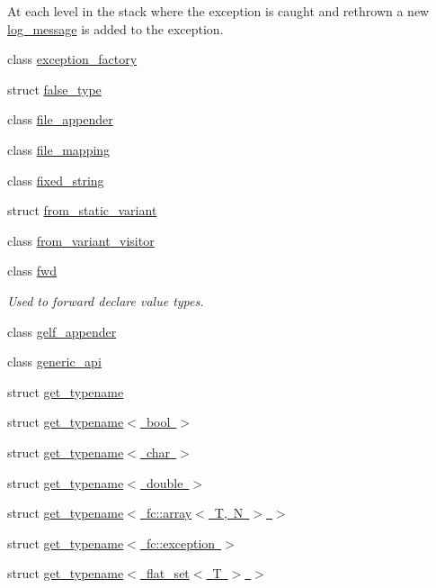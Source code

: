\begin{DoxyCompactItemize}
\begin{DoxyCompactList}
At each level in the stack where the exception is caught and rethrown a new \mbox{\hyperlink{classfc_1_1log__message}{log\+\_\+message}} is added to the exception. \end{DoxyCompactList}\item 
class \mbox{\hyperlink{classfc_1_1exception__factory}{exception\+\_\+factory}}
\item 
struct \mbox{\hyperlink{structfc_1_1false__type}{false\+\_\+type}}
\item 
class \mbox{\hyperlink{classfc_1_1file__appender}{file\+\_\+appender}}
\item 
class \mbox{\hyperlink{classfc_1_1file__mapping}{file\+\_\+mapping}}
\item 
class \mbox{\hyperlink{classfc_1_1fixed__string}{fixed\+\_\+string}}
\item 
struct \mbox{\hyperlink{structfc_1_1from__static__variant}{from\+\_\+static\+\_\+variant}}
\item 
class \mbox{\hyperlink{classfc_1_1from__variant__visitor}{from\+\_\+variant\+\_\+visitor}}
\item 
class \mbox{\hyperlink{classfc_1_1fwd}{fwd}}
\begin{DoxyCompactList}\small\item\em Used to forward declare value types. \end{DoxyCompactList}\item 
class \mbox{\hyperlink{classfc_1_1gelf__appender}{gelf\+\_\+appender}}
\item 
class \mbox{\hyperlink{classfc_1_1generic__api}{generic\+\_\+api}}
\item 
struct \mbox{\hyperlink{structfc_1_1get__typename}{get\+\_\+typename}}
\item 
struct \mbox{\hyperlink{structfc_1_1get__typename_3_01bool_01_4}{get\+\_\+typename$<$ bool $>$}}
\item 
struct \mbox{\hyperlink{structfc_1_1get__typename_3_01char_01_4}{get\+\_\+typename$<$ char $>$}}
\item 
struct \mbox{\hyperlink{structfc_1_1get__typename_3_01double_01_4}{get\+\_\+typename$<$ double $>$}}
\item 
struct \mbox{\hyperlink{structfc_1_1get__typename_3_01fc_1_1array_3_01_t_00_01_n_01_4_01_4}{get\+\_\+typename$<$ fc\+::array$<$ T, N $>$ $>$}}
\item 
struct \mbox{\hyperlink{structfc_1_1get__typename_3_01fc_1_1exception_01_4}{get\+\_\+typename$<$ fc\+::exception $>$}}
\item 
struct \mbox{\hyperlink{structfc_1_1get__typename_3_01flat__set_3_01_t_01_4_01_4}{get\+\_\+typename$<$ flat\+\_\+set$<$ T $>$ $>$}}

\end{DoxyCompactItemize}

